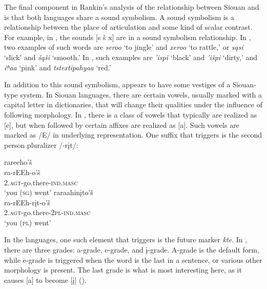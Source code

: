 \documentclass[output=paper]{LSP/langsci}
\begin{document}
The final component in Rankin's \citeyear{Rankin1998scy} analysis of the relationship between Siouan and  is that both languages share a  sound symbolism. A sound symbolism is a relationship between the place of articulation and some kind of scalar contrast. For example, in , the sounds [s \v{s} x] are in a sound symbolism relationship. In , two examples of such words are \emph{seroo} `to jingle' and \emph{xeroo} `to rattle,' or \emph{s\k{a}si} `slick' and \emph{\v{s}\k{a}\v{s}i} `smooth.' In , such examples are \emph{'ispi} `black' and \emph{'i\v{s}pi} `dirty,' and \emph{\v{c}ʰa\textbeltl a} `pink' and \emph{tstextipa{\super h}ya\textbeltl a} `red.'

In addition to this sound symbolism,  appears to have some vestiges of a Siouan-type  system. In Siouan languages, there are certain vowels, usually marked with a capital letter in dictionaries, that will change their qualities under the influence of following morphology. In , there is a class of vowels that typically are realized as [e], but when followed by certain affixes are realized as [a]. Such vowels are marked as /E/ in underlying representation. One suffix that triggers  is the second person pluralizer /-r\k{i}t/:

\ea
	\ea 
	\glll rareeho'\v{s} \\
	ra-rEEh-o'\v{s} \\	
	\textsc{2.agt}-go.there-\textsc{ind.masc} \\
	\glt	`you (\textsc{sg}) went'
	\ex 
	\glll raraahin\k{i}to'\v{s}\\
	ra-rEEh-r\k{i}t-o'\v{s}\\	
	\textsc{2.agt}-go.there-\textsc{2pl-ind.masc}\\
	\glt	`you (\textsc{pl}) went'
	\z
\z

In the  languages, one such element that triggers  is the future marker \emph{kte}. In , there are three  grades: a-grade, e-grade, and \k{i}-grade. A-grade is the default form, while e-grade is triggered when the word is the last in a sentence, or various other morphology is present. The last grade is what is most interesting here, as it causes [a] to become [\k{i}] (\citealt{Ullrich2008}).
\end{document}
